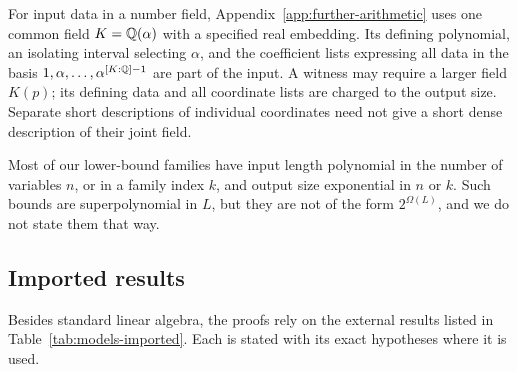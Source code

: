 For input data in a number field, Appendix~\ref{app:further-arithmetic}
uses one common field $K=\mathbb Q(\alpha)$ with a specified real embedding. Its
defining polynomial, an isolating interval selecting $\alpha$, and the
coefficient lists expressing all data in the basis
$1,\alpha,\ldots,\alpha^{[K:\mathbb Q]-1}$ are part of the input. A witness may
require a larger field $K(p)$; its defining data and all coordinate lists
are charged to the output size. Separate short descriptions of individual
coordinates need not give a short dense description of their joint field.

Most of our lower-bound families have input length polynomial in the number
of variables $n$, or in a family index $k$, and output size exponential in
$n$ or $k$. Such bounds are superpolynomial in $L$, but they are not of the
form $2^{\Omega(L)}$, and we do not state them that way.

\subsection{Imported results}
\label{sec:models-imported}

Besides standard linear algebra, the proofs rely on the external results
listed in Table~\ref{tab:models-imported}. Each is stated with its exact
hypotheses where it is used.

